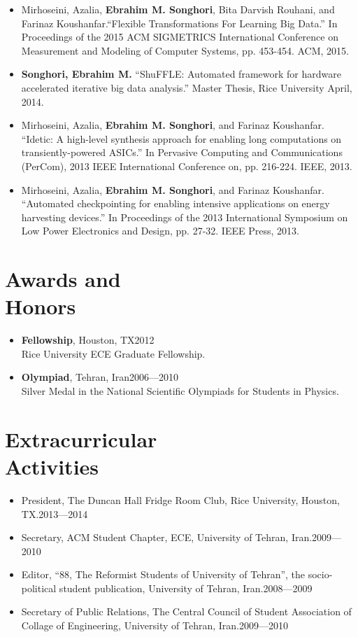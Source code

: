 \documentclass[overlapped]{res}
\begin{document}
\begin{resume}
\begin{itemize}
\item Mirhoseini, Azalia, {\bf Ebrahim M. Songhori}, Bita Darvish Rouhani, and Farinaz Koushanfar.``Flexible Transformations For Learning Big Data.'' In Proceedings of the 2015 ACM SIGMETRICS International Conference on Measurement and Modeling of Computer Systems, pp. 453-454. ACM, 2015.
\item {\bf Songhori, Ebrahim M.} ``ShuFFLE: Automated framework for hardware accelerated iterative big data analysis.'' Master Thesis, Rice University April, 2014.
\item Mirhoseini, Azalia, {\bf Ebrahim M. Songhori}, and Farinaz Koushanfar. ``Idetic: A high-level synthesis approach for enabling long computations on transiently-powered ASICs.'' In Pervasive Computing and Communications (PerCom), 2013 IEEE International Conference on, pp. 216-224. IEEE, 2013.
\item Mirhoseini, Azalia, {\bf Ebrahim M. Songhori}, and Farinaz Koushanfar. ``Automated checkpointing for enabling intensive applications on energy harvesting devices.'' In Proceedings of the 2013 International Symposium on Low Power Electronics and Design, pp. 27-32. IEEE Press, 2013.
\end{itemize}

\section{Awards and\\ Honors}
\begin{itemize}
\item {\bf Fellowship}, Houston, TX\hfill 2012\\
Rice University ECE Graduate Fellowship.
\item {\bf Olympiad}, Tehran, Iran\hfill\hfill 2006---2010\\
Silver Medal in the National Scientific Olympiads for Students in Physics.\\
\end{itemize}

\section{Extracurricular\\ Activities}
\begin{itemize}
\item President, The Duncan Hall Fridge Room Club, Rice University, Houston, TX.\hfill 2013---2014
\item Secretary, ACM Student Chapter, ECE, University of Tehran, Iran.\hfill 2009---2010
\item Editor, ``88, The Reformist Students of University of Tehran'', the socio-political student publication, University of Tehran, Iran.\hfill 2008---2009
\item Secretary of Public Relations, The Central Council of Student Association of Collage of Engineering, University of Tehran, Iran.\hfill 2009---2010
\end{itemize}

\end{resume}
\end{document}
